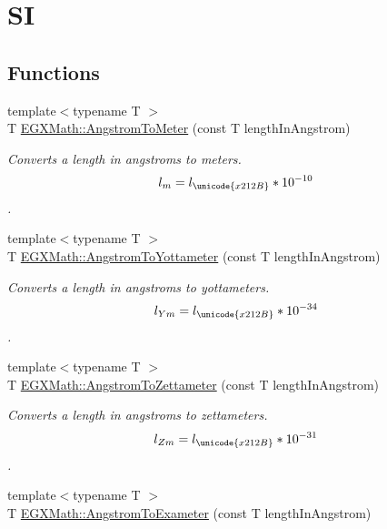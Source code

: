 \hypertarget{group___e_g_x_math-_conversions-_length_conversions-_non-_s_i-_angstrom-_s_i}{}\section{SI}
\label{group___e_g_x_math-_conversions-_length_conversions-_non-_s_i-_angstrom-_s_i}
\subsection*{Functions}
\begin{DoxyCompactItemize}
\item 
{\footnotesize template$<$typename T $>$ }\\T \mbox{\hyperlink{group___e_g_x_math-_conversions-_length_conversions-_non-_s_i-_angstrom-_s_i_ga342cd009d104ec283921cd70841d500f}{E\+G\+X\+Math\+::\+Angstrom\+To\+Meter}} (const T length\+In\+Angstrom)
\begin{DoxyCompactList}\small\item\em Converts a length in angstroms to meters. \[ l_{m}=l_{\unicode{x212B}} * 10^{-10} \]. \end{DoxyCompactList}\item 
{\footnotesize template$<$typename T $>$ }\\T \mbox{\hyperlink{group___e_g_x_math-_conversions-_length_conversions-_non-_s_i-_angstrom-_s_i_gae57ab83be8b18be2436ced646312c17f}{E\+G\+X\+Math\+::\+Angstrom\+To\+Yottameter}} (const T length\+In\+Angstrom)
\begin{DoxyCompactList}\small\item\em Converts a length in angstroms to yottameters. \[ l_{Ym}=l_{\unicode{x212B}} * 10^{-34} \]. \end{DoxyCompactList}\item 
{\footnotesize template$<$typename T $>$ }\\T \mbox{\hyperlink{group___e_g_x_math-_conversions-_length_conversions-_non-_s_i-_angstrom-_s_i_ga0af804446e88f9b27f2e278727a5a120}{E\+G\+X\+Math\+::\+Angstrom\+To\+Zettameter}} (const T length\+In\+Angstrom)
\begin{DoxyCompactList}\small\item\em Converts a length in angstroms to zettameters. \[ l_{Zm}=l_{\unicode{x212B}} * 10^{-31} \]. \end{DoxyCompactList}\item 
{\footnotesize template$<$typename T $>$ }\\T \mbox{\hyperlink{group___e_g_x_math-_conversions-_length_conversions-_non-_s_i-_angstrom-_s_i_gac419ce36b1288ba8547e669af6b5dd75}{E\+G\+X\+Math\+::\+Angstrom\+To\+Exameter}} (const T length\+In\+Angstrom)

\end{DoxyCompactItemize}
